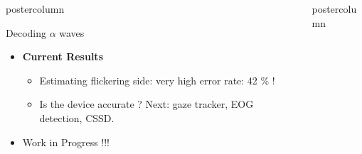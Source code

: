 \documentclass[final]{beamer}
\newlength{\columnheight}
\begin{document}
\begin{frame}
\begin{columns}
\begin{column}{.49\textwidth}
\begin{beamercolorbox}[center,wd=\textwidth]{postercolumn}
\begin{minipage}[T]{.95\textwidth}
{\begin{block}{Decoding $ \alpha$  waves}
\begin{itemize}
\begin{enumerate}
\begin{columns}
				\end{columns}
				                
                \end{enumerate}
                
                \item \textbf{Current Results}
                \begin{itemize}
                \item Estimating flickering side: very high error rate: 42 \% !
                \item Is the device accurate ?   Next:  gaze tracker, EOG detection, CSSD.
                \end{itemize}
                \item Work in Progress !!!
                \end{itemize}
            \end{block}
            \vfill
          }
        \end{minipage}
      \end{beamercolorbox}
    \end{column}

    \begin{column}{.49\textwidth}
      \begin{beamercolorbox}[center,wd=\textwidth]{postercolumn}
        \begin{minipage}[T]{.95\textwidth} %
          \parbox[t][\columnheight]{\textwidth}{ %
            
}
\end{minipage}
\end{beamercolorbox}
\end{column}
\end{columns}
\end{frame}
\end{document}
